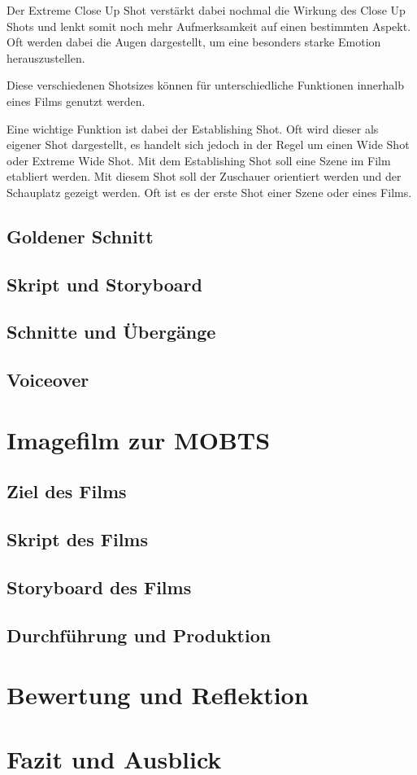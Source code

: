 Der Extreme Close Up Shot verstärkt dabei nochmal die Wirkung des Close Up Shots und lenkt somit noch mehr Aufmerksamkeit auf einen bestimmten Aspekt. Oft werden dabei die Augen dargestellt, um eine besonders starke Emotion herauszustellen.

Diese verschiedenen Shotsizes können für unterschiedliche Funktionen innerhalb eines Films genutzt werden.\autocite{Studiobinder.2020}

Eine wichtige Funktion ist dabei der Establishing Shot. Oft wird dieser als eigener Shot dargestellt, es handelt sich jedoch in der Regel um einen Wide Shot oder Extreme Wide Shot. Mit dem Establishing Shot soll eine Szene im Film etabliert werden. Mit diesem Shot soll der Zuschauer orientiert werden und der Schauplatz gezeigt werden. Oft ist es der erste Shot einer Szene oder eines Films.



\subsection{Goldener Schnitt}
\subsection{Skript und Storyboard}
\subsection{Schnitte und Übergänge}
\subsection{Voiceover}
\section{Imagefilm zur MOBTS}
\subsection{Ziel des Films}
\subsection{Skript des Films}
\subsection{Storyboard des Films}
\subsection{Durchführung und Produktion}
\section{Bewertung und Reflektion}
\section{Fazit und Ausblick}